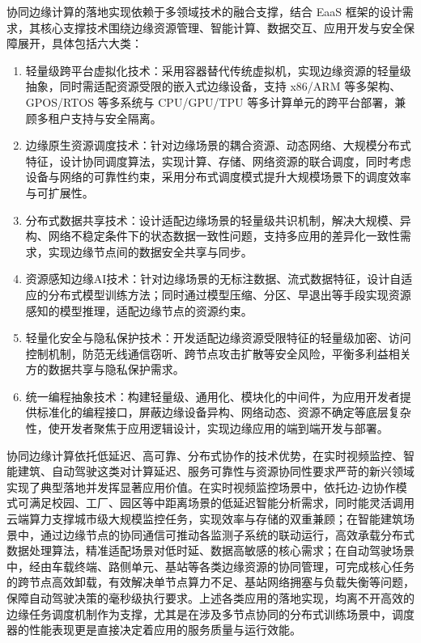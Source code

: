 协同边缘计算的落地实现依赖于多领域技术的融合支撑，结合 EaaS 框架的设计需求，其核心支撑技术围绕边缘资源管理、智能计算、数据交互、应用开发与安全保障展开，具体包括六大类\cite{EaaS}：
\begin{enumerate}[topsep = 0 pt, itemsep= 0 pt, parsep=0pt, partopsep=0pt, leftmargin=0pt, itemindent=48pt, labelsep=0pt, listparindent=24pt, label=（\arabic*）]
    \item 轻量级跨平台虚拟化技术：采用容器替代传统虚拟机，实现边缘资源的轻量级抽象，同时需适配资源受限的嵌入式边缘设备，支持 x86/ARM 等多架构、GPOS/RTOS 等多系统与 CPU/GPU/TPU 等多计算单元的跨平台部署，兼顾多租户支持与安全隔离。
    \item 边缘原生资源调度技术\cite{10631066}：针对边缘场景的耦合资源、动态网络、大规模分布式特征，设计协同调度算法，实现计算、存储、网络资源的联合调度，同时考虑设备与网络的可靠性约束，采用分布式调度模式提升大规模场景下的调度效率与可扩展性。
    \item 分布式数据共享技术：设计适配边缘场景的轻量级共识机制，解决大规模、异构、网络不稳定条件下的状态数据一致性问题，支持多应用的差异化一致性需求，实现边缘节点间的数据安全共享与同步。
    \item 资源感知边缘AI技术：针对边缘场景的无标注数据、流式数据特征，设计自适应的分布式模型训练方法；同时通过模型压缩、分区、早退出等手段实现资源感知的模型推理，适配边缘节点的资源约束。
    \item 轻量化安全与隐私保护技术：开发适配边缘资源受限特征的轻量级加密、访问控制机制，防范无线通信窃听、跨节点攻击扩散等安全风险，平衡多利益相关方的数据共享与隐私保护需求。
    \item 统一编程抽象技术：构建轻量级、通用化、模块化的中间件，为应用开发者提供标准化的编程接口，屏蔽边缘设备异构、网络动态、资源不确定等底层复杂性，使开发者聚焦于应用逻辑设计，实现边缘应用的端到端开发与部署。
    \end{enumerate}

协同边缘计算依托低延迟、高可靠、分布式协作的技术优势，在实时视频监控、智能建筑、自动驾驶这类对计算延迟、服务可靠性与资源协同性要求严苛的新兴领域实现了典型落地并发挥显著应用价值。在实时视频监控场景中，依托边-边协作模式可满足校园、工厂、园区等中距离场景的低延迟智能分析需求，同时能灵活调用云端算力支撑城市级大规模监控任务，实现效率与存储的双重兼顾；在智能建筑场景中，通过边缘节点的协同通信可推动各监测子系统的联动运行，高效承载分布式数据处理算法，精准适配场景对低时延、数据高敏感的核心需求；在自动驾驶场景中，经由车载终端、路侧单元、基站等各类边缘资源的协同管理，可完成核心任务的跨节点高效卸载，有效解决单节点算力不足、基站网络拥塞与负载失衡等问题，保障自动驾驶决策的毫秒级执行要求。上述各类应用的落地实现，均离不开高效的边缘任务调度机制作为支撑，尤其是在涉及多节点协同的分布式训练场景中，调度器的性能表现更是直接决定着应用的服务质量与运行效能。

